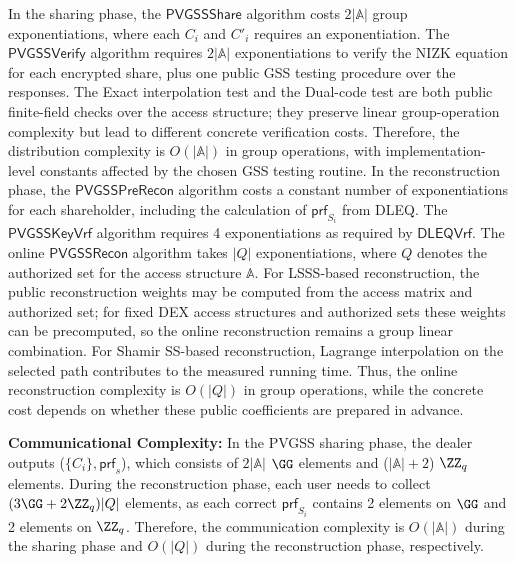 \documentclass[runningheads]{llncs}
\newcommand{\pvgssShare}{\mathsf{PVGSSShare}}
\newcommand{\pvgssVerify}{\mathsf{PVGSSVerify}}
\newcommand{\pvgssPreRecon}{\mathsf{PVGSSPreRecon}}
\newcommand{\pvgssKeyVrf}{\mathsf{PVGSSKeyVrf}}
\newcommand{\pvgssRecon}{\mathsf{PVGSSRecon}}
\newcommand{\dleqVrf}{\mathsf{DLEQVrf}}
\newcommand{\proofs}{\mathsf{prf}}
\begin{document}
In the sharing phase, the $\pvgssShare$ algorithm costs $2|\mathbb{A}|$ group exponentiations, where each $C_i$ and $C'_i$ requires an exponentiation. The $\pvgssVerify$ algorithm requires $2|\mathbb{A}|$ exponentiations to verify the NIZK equation for each encrypted share, plus one public GSS testing procedure over the responses. The Exact interpolation test and the Dual-code test are both public finite-field checks over the access structure; they preserve linear group-operation complexity but lead to different concrete verification costs. Therefore, the distribution complexity is \(O(|\mathbb{A}|)\) in group operations, with implementation-level constants affected by the chosen GSS testing routine.
In the reconstruction phase, the $\pvgssPreRecon$ algorithm costs a constant number of exponentiations for each shareholder, including the calculation of $\proofs_{S_i}$ from DLEQ. The $\pvgssKeyVrf$ algorithm requires 4 exponentiations as required by \(\dleqVrf\). The online $\pvgssRecon$ algorithm takes $|Q|$ exponentiations, where $Q$ denotes the authorized set for the access structure $\mathbb{A}$. For LSSS-based reconstruction, the public reconstruction weights may be computed from the access matrix and authorized set; for fixed DEX access structures and authorized sets these weights can be precomputed, so the online reconstruction remains a group linear combination. For Shamir SS-based reconstruction, Lagrange interpolation on the selected path contributes to the measured running time. Thus, the online reconstruction complexity is $O(|Q|)$ in group operations, while the concrete cost depends on whether these public coefficients are prepared in advance.



\textbf{Communicational Complexity:} In the PVGSS sharing phase, the dealer outputs ($\{C_i\}, \proofs_s$), which consists of $2|\mathbb{A}|$ $\GG$ elements and ($|\mathbb{A}|+2$) $\ZZ_q$ elements.
During the reconstruction phase, each user needs to collect $(3\GG+2\ZZ_q)|Q|$ elements, as each correct $\proofs_{S_i}$ contains 2 elements on $\GG$ and 2 elements on $\ZZ_q$.
Therefore, the communication complexity is \(O(|\mathbb{A}|)\) during the sharing phase and \(O(|Q|)\) during the reconstruction phase, respectively.



\end{document}
